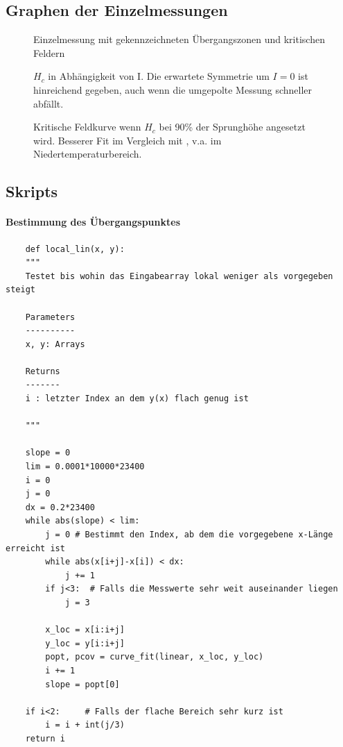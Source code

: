 \documentclass[german,  %
parskip=full,  %
headsepline]{scrartcl}
\newcommand{\bcref}[1]{\namecref{#1} \textcolor{blue}{\labelcref{#1}}}
\begin{document}
\subsection{Graphen der Einzelmessungen}
\begin{figure}[!htp]
    \centering
    
    \caption{Einzelmessung mit gekennzeichneten Übergangszonen und kritischen Feldern}
    \label{fig:RH}
\end{figure}
\begin{figure}[!htp]
    \centering
    
\end{figure}
\begin{figure}[!htp]
    \centering
    
\end{figure}
\begin{figure}
    \centering
    
    \caption{$H_c$ in Abhängigkeit von I. Die erwartete Symmetrie um $I=0$ ist hinreichend gegeben, auch wenn die umgepolte Messung schneller abfällt.}
    \label{fig:Hcpretrial}
\end{figure}
\begin{figure}
    \centering
    
    \caption{Kritische Feldkurve wenn $H_c$ bei 90\% der Sprunghöhe angesetzt wird. Besserer Fit im Vergleich mit \bcref{fig:Hcplot}, v.a. im Niedertemperaturbereich.}
    \label{fig:Hc90}
\end{figure}
\clearpage
\subsection{Skripts}
\paragraph{Bestimmung des Übergangspunktes}
\begin{verbatim}
    def local_lin(x, y):
    """
    Testet bis wohin das Eingabearray lokal weniger als vorgegeben steigt

    Parameters
    ----------
    x, y: Arrays

    Returns
    -------
    i : letzter Index an dem y(x) flach genug ist

    """
    
    slope = 0
    lim = 0.0001*10000*23400
    i = 0
    j = 0
    dx = 0.2*23400
    while abs(slope) < lim:
        j = 0 # Bestimmt den Index, ab dem die vorgegebene x-Länge erreicht ist
        while abs(x[i+j]-x[i]) < dx:
            j += 1
        if j<3:  # Falls die Messwerte sehr weit auseinander liegen
            j = 3
        
        x_loc = x[i:i+j]
        y_loc = y[i:i+j]
        popt, pcov = curve_fit(linear, x_loc, y_loc)
        i += 1
        slope = popt[0]
        
    if i<2:     # Falls der flache Bereich sehr kurz ist
        i = i + int(j/3)
    return i
\end{verbatim}
\end{document}
